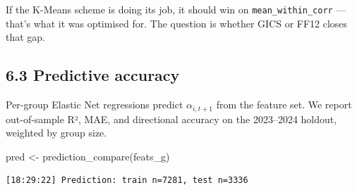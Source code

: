 \documentclass[
  letterpaper,
  DIV=11,
  numbers=noendperiod]{scrartcl}
\newenvironment{Shaded}{\begin{snugshade}}{\end{snugshade}}
\newcommand{\AttributeTok}[1]{\textcolor[rgb]{0.40,0.45,0.13}{#1}}
\newcommand{\DecValTok}[1]{\textcolor[rgb]{0.68,0.00,0.00}{#1}}
\newcommand{\FunctionTok}[1]{\textcolor[rgb]{0.28,0.35,0.67}{#1}}
\newcommand{\NormalTok}[1]{\textcolor[rgb]{0.00,0.23,0.31}{#1}}
\newcommand{\OtherTok}[1]{\textcolor[rgb]{0.00,0.23,0.31}{#1}}
\newcommand{\SpecialCharTok}[1]{\textcolor[rgb]{0.37,0.37,0.37}{#1}}
\newcommand{\StringTok}[1]{\textcolor[rgb]{0.13,0.47,0.30}{#1}}
\begin{document}
If the K-Means scheme is doing its job, it should win on
\texttt{mean\_within\_corr} --- that's what it was optimised for. The
question is whether GICS or FF12 closes that gap.

\subsection{6.3 Predictive accuracy}\label{predictive-accuracy}

Per-group Elastic Net regressions predict \(\alpha_{i,t+1}\) from the
feature set. We report out-of-sample R², MAE, and directional accuracy
on the 2023--2024 holdout, weighted by group size.

\begin{Shaded}
\begin{Highlighting}[]
\NormalTok{pred }\OtherTok{\textless{}{-}} \FunctionTok{prediction\_compare}\NormalTok{(feats\_g)}
\end{Highlighting}
\end{Shaded}

\begin{verbatim}
[18:29:22] Prediction: train n=7281, test n=3336
\end{verbatim}

\begin{Shaded}
\end{Shaded}
\end{document}
